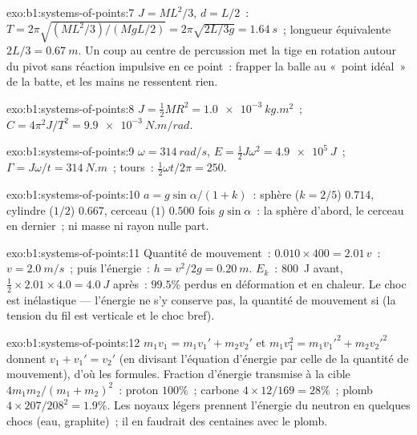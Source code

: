 \begin{solution}{exo:b1:systems-of-points:7}
$J = ML^2/3$, $d = L/2$~: $T = 2\pi\sqrt{(ML^2/3)/(MgL/2)} = 2\pi\sqrt{2L/3g}
= \qty{1.64}{s}$~; longueur équivalente $2L/3 = \qty{0.67}{m}$. Un coup au
centre de percussion met la tige en rotation autour du pivot sans
réaction impulsive en ce point~: frapper la balle au «~point idéal~» de
la batte, et les mains ne ressentent rien.
\end{solution}

\begin{solution}{exo:b1:systems-of-points:8}
$J = \tfrac12 MR^2 = \qty{1.0e-3}{kg.m^2}$~; $C = 4\pi^2J/T^2 = \qty{9.9e-3}{N.m/rad}$.
\end{solution}

\begin{solution}{exo:b1:systems-of-points:9}
$\omega = \qty{314}{rad/s}$, $E = \tfrac12 J\omega^2 = \qty{4.9e5}{J}$~;
$\Gamma = J\omega/t = \qty{314}{N.m}$~; tours~: $\tfrac12\omega t/2\pi = 250$.
\end{solution}

\begin{solution}{exo:b1:systems-of-points:10}
$a = g\sin\alpha/(1 + k)$~: sphère ($k = 2/5$) $0.714$, cylindre ($1/2$)
$0.667$, cerceau ($1$) $0.500$ fois $g\sin\alpha$~: la sphère d'abord, le
cerceau en dernier~; ni masse ni rayon nulle part.
\end{solution}

\begin{solution}{exo:b1:systems-of-points:11}
Quantité de mouvement~: $0.010 \times 400 = 2.01\,v$~: $v = \qty{2.0}{m/s}$~;
puis l'énergie~: $h = v^2/2g = \qty{0.20}{m}$. $E_k$~: \qty{800}{J} avant, $\tfrac12 \times
2.01 \times 4.0 = \qty{4.0}{J}$ après~: $99.5\%$ perdus en déformation et
en chaleur. Le choc est inélastique --- l'énergie ne s'y conserve pas,
la quantité de mouvement si (la tension du fil est verticale et le choc bref).
\end{solution}

\begin{solution}{exo:b1:systems-of-points:12}
$m_1v_1 = m_1v_1' + m_2v_2'$ et $m_1v_1^2 = m_1v_1'^2 + m_2v_2'^2$ donnent
$v_1 + v_1' = v_2'$ (en divisant l'équation d'énergie par celle de la
quantité de mouvement), d'où les formules. Fraction d'énergie transmise à la cible $4m_1m_2/(m_1 + m_2)^2$~:
proton $100\%$~; carbone $4 \times 12/169 = 28\%$~; plomb $4 \times 207/208^2 =
1.9\%$. Les noyaux légers prennent l'énergie du neutron en quelques chocs
(eau, graphite)~; il en faudrait des centaines avec le plomb.
\end{solution}

